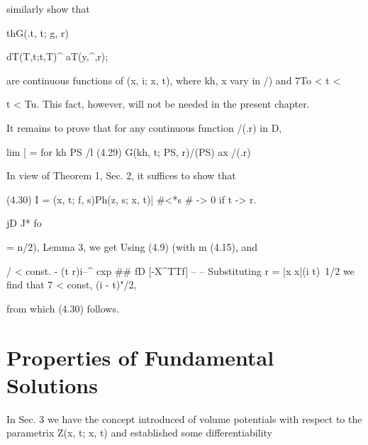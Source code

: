 similarly show that

thG(.t, t; g, r)

\begin{ocrformula}
dT(T,t;t,T)^                      aT(y,^,r);
\end{ocrformula}

\begin{ocrformula}
are continuous  functions of (x, i; x, t), where kh, x vary in /) and 7To < t <
\end{ocrformula}

t < Tu. This fact, however, will not be needed in the present chapter.

\begin{ocrformula}
It remains to prove that for any continuous      function /(.r) in D,
\end{ocrformula}

\begin{ocrformula}
lim [                                           =               for kh PS /l
(4.29)                              G(kh, t; PS, r)/(PS) ax                    /(.r)
\end{ocrformula}

In view of Theorem 1, Sec. 2, it suffices to show that

\begin{ocrformula}
(4.30)         I =                    \Z(x, t; f, s)Ph(z, s; x, t)| #<*s                     #    -> 0           if t -> r.
\end{ocrformula}

jD J* fo

\begin{ocrformula}
= n/2),                                            Lemma     3, we get
Using     (4.9) (with m         (4.15), and
\end{ocrformula}

\begin{ocrformula}
/ < const.                    -
(t           r)i--^           cxp                            ##
fD                                        [-X^TTf]
--           --
Substituting          r =    |x        x|(i    t)~1/2 we find that
7 < const, (i - t)"/2,
\end{ocrformula}

\begin{ocrformula}
from     which       (4.30) follows.
\end{ocrformula}

\section{Properties of Fundamental Solutions}
In Sec. 3 we have the concept introduced of volume potentials with respect to the parametrix Z(x, t; x, t) and established some differentiability

